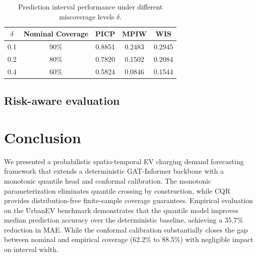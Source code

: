 \documentclass[conference]{IEEEtran}
\begin{document}
\begin{table}[htbp]
\centering
\caption{Prediction interval performance under different miscoverage levels $\delta$.}
\begin{tabular}{|c|c|c|c|c|}
\hline
\textbf{$\delta$} & \textbf{Nominal Coverage} & \textbf{PICP} & \textbf{MPIW} & \textbf{WIS} \\
\hline
0.1 & 90\% & 0.8851 & 0.2483 & 0.2945 \\
\hline
0.2 & 80\% & 0.7820 & 0.1502 & 0.2084 \\
\hline
0.4 & 60\% & 0.5824 & 0.0846 & 0.1544 \\
\hline
\end{tabular}
\label{tab:sensi}
\end{table}
\vspace{-4mm}

\subsection{Risk-aware evaluation}




\section{Conclusion}

We presented a probabilistic spatio-temporal EV charging demand forecasting framework that extends a deterministic GAT-Informer backbone with a monotonic quantile head and conformal calibration. The monotonic parameterization eliminates quantile crossing by construction, while CQR provides distribution-free finite-sample coverage guarantees. Empirical evaluation on the UrbanEV benchmark demonstrates that the quantile model improves median prediction accuracy over the deterministic baseline, achieving a 35.7\% reduction in MAE. While the conformal calibration substantially closes the gap between nominal and empirical coverage (62.2\% to 88.5\%) with negligible impact on interval width. 




\end{document}
